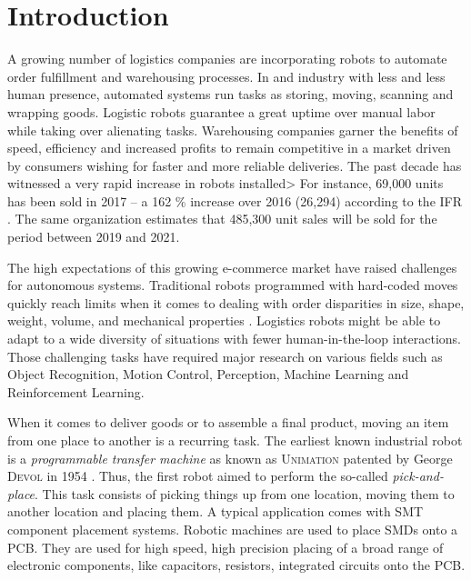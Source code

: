 \documentclass[/home/francois/latex/report/main.tex]{subfiles}
\begin{document}
\chapter{Introduction}
\label{chapter:introduction}

A growing number of logistics companies are incorporating robots to automate order fulfillment and warehousing processes. In and industry with less and less human presence, automated systems run tasks as storing, moving, scanning and wrapping goods. Logistic robots guarantee a great uptime over manual labor while taking over alienating tasks. Warehousing companies garner the benefits of speed, efficiency and increased profits to remain competitive in a market driven by consumers wishing for faster and more reliable deliveries. The past decade has witnessed a very rapid increase in robots installed> For instance, 69,000 units has been sold in 2017 – a 162 \% increase over 2016 (26,294) according to the \ac{IFR} \cite{industrialRobot2018}. The same organization estimates that 485,300 unit sales will be sold for the period between 2019 and 2021.

The high expectations of this growing e-commerce market have raised challenges for autonomous systems. Traditional robots programmed with hard-coded moves quickly reach limits when it comes to dealing with order disparities in size, shape, weight, volume, and mechanical properties \cite{GQHuang2015}. Logistics robots might be able to adapt to a wide diversity of situations with fewer human-in-the-loop interactions. Those challenging tasks have required major research on various fields such as Object Recognition, Motion Control, Perception, Machine Learning and Reinforcement Learning.

When it comes to deliver goods or to assemble a final product, moving an item from one place to another is a recurring task. The earliest known industrial robot is a \textit{programmable transfer machine} as known as \textsc{Unimation} patented by George \textsc{Devol} in 1954 \cite{Wallen2008}. Thus, the first robot aimed to perform the so-called \textit{pick-and-place}. This task consists of picking things up from one location, moving them to another location and placing them. A typical application comes with \ac{SMT} component placement systems. Robotic machines are used to place \ac{SMDs} onto a \ac{PCB}. They are used for high speed, high precision placing of a broad range of electronic components, like capacitors, resistors, integrated circuits onto the \ac{PCB}.
\end{document}
